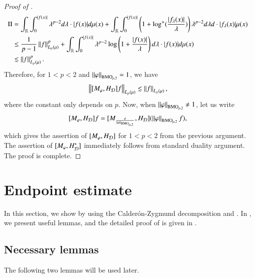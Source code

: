 \documentclass[leqno]{amsart}
\begin{document}
\begin{proof}[Proof of ]
\begin{align*}
\mathrm{II}&= \int_{{\mathbb R}}\int_{0}^{|f(x)|}
\lambda^{p-2}d\lambda \cdot |f(x)|d \mu(x)+ \int_{{\mathbb R}}\int_{0}^{|f(x)|}\left(1+\log^{+}(\frac{|f_{\lambda}(x)|}{\lambda})\right)
\lambda^{p-2}d\lambda d \cdot |f_{\lambda}(x)|\mu(x)\\
&\leq\frac{1}{p-1}\left\| f \right\|_{L_{p}(\mu)}^{p}
+\int_{{\mathbb R}}\int_{0}^{|f(x)|}\lambda^{p-2}\log\left(1+\frac{|f(x)|}{\lambda}\right)d\lambda\cdot|f(x)|d\mu(x)\\
&\lesssim\left\| f \right\|_{L_{p}(\mu)}^{p}.
\end{align*}
Therefore, for $1<p<2$ and $\left\| \varphi \right\|_{{\rm BMO}_{\mu,2}}=1$, we have
\begin{align*}
\left\| [M_{\varphi},H_{{\mathcal D}}]f \right\|_{L_{p}(\mu)}\lesssim\left\| f \right\|_{L_{p}(\mu)},
\end{align*}
where the constant only depends  on $p$. Now, when $\left\| \varphi \right\|_{{\rm BMO}_{\mu,2}}\neq1$, let us write $$[M_{\varphi},H_{{\mathcal D}}]f=[M_{\frac{\varphi}{\left\| \varphi \right\|_{{\rm BMO}_{\mu,2}}}},H_{{\mathcal D}}](\left\| \varphi \right\|_{{\rm BMO}_{\mu,2}}f),$$
which gives the assertion of $[M_{\varphi},H_{{\mathcal D}}]$ for $1<p<2$ from the previous argument. The assertion of $[M_{\varphi},H_{{\mathcal D}}^{*}]$ immediately follows from standard  duality argument. The proof is complete.
\end{proof}


\section{Endpoint estimate}\label{sec-end}
In this section, we show  by using the Calder\'{o}n-Zygmund decomposition and  . In , we present useful lemmas, and the detailed proof of  is given in .

\subsection{Necessary lemmas}\label{sec-nece lemmas}
The following two   lemmas will be used later.
\end{document}
